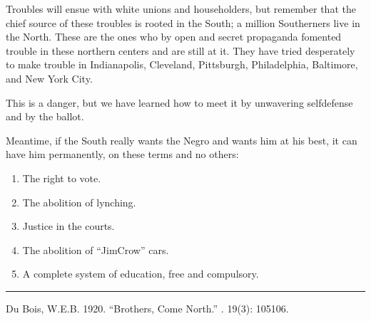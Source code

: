 \documentclass[letterpaper,10pt,english]{jupyterBook}
\begin{document}
\sphinxAtStartPar
Troubles will ensue with white unions and householders, but remember that the chief source of these troubles is rooted in the South; a million Southerners live in the North. These are the ones who by open and secret propaganda fomented trouble in these northern centers and are still at it. They have tried desperately to make trouble in Indianapolis, Cleveland, Pittsburgh, Philadelphia, Baltimore, and New York City.

\sphinxAtStartPar
This is a danger, but we have learned how to meet it by unwavering self\sphinxhyphen{}defense and by the ballot.

\sphinxAtStartPar
Meantime, if the South really wants the Negro and wants him at his best, it can have him permanently, on these terms and no others:
\begin{enumerate}
%
\item {} 
\sphinxAtStartPar
The right to vote.

\item {} 
\sphinxAtStartPar
The abolition of lynching.

\item {} 
\sphinxAtStartPar
Justice in the courts.

\item {} 
\sphinxAtStartPar
The abolition of “Jim\sphinxhyphen{}Crow” cars.

\item {} 
\sphinxAtStartPar
A complete system of education, free and compulsory.

\end{enumerate}


\bigskip\hrule\bigskip


\sphinxAtStartPar
{} Du Bois, W.E.B. 1920. “Brothers, Come North.” . 19(3): 105\sphinxhyphen{}106.
\end{document}

